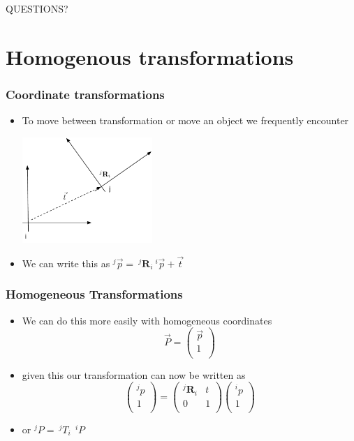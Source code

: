\documentclass[10pt]{beamer}
\begin{document}
\begin{frame}
  \centerline{\Huge QUESTIONS?}
\end{frame}

\section{Homogenous transformations}

\begin{frame}
  \frametitle{Coordinate transformations}
  \begin{itemize}
  \item To move between transformation or move an object we frequently encounter
    \centerline{\includegraphics[height=4cm]{geometric-transformation}}
  \item We can write this as $^{j}\vec{p} = ~^{j}\mathbf{R}_i ~^{i}\vec{p} + \vec{t}$
  \end{itemize}
\end{frame}

\begin{frame}
  \frametitle{Homogeneous Transformations}
  \begin{itemize}
  \item We can do this more easily with homogeneous coordinates
    \[
      \vec{P} = \left(
        \begin{array}{c}
          \vec{p} \\ 1 \\
        \end{array}
      \right)
    \]
  \item given this our transformation can now be written as
    \[
      \left(
        \begin{array}{c}
          ^{j}p \\ 1 \\ 
        \end{array}
      \right)
      =
      \left(
        \begin{array}{cc}
          ^{j}\mathbf{R}_i & t \\
          0                & 1 \\
        \end{array}
      \right)
      \left(
        \begin{array}{c}
          ^{i}p \\ 1 \\ 
        \end{array}
      \right)
    \]
  \item or $ ^{j}P = ~^{j}T_{i} ~~ ^{i}P$

  \end{itemize}
\end{frame}
\end{document}
